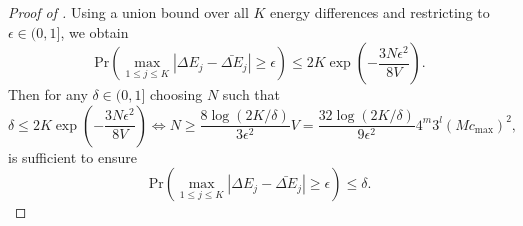 \begin{proof}[Proof of ]
    Using a union bound over all $K$ energy differences and restricting to $\epsilon\in (0,1]$, we obtain
    \begin{equation}
        \mathrm{Pr}\left(\max_{1\leq j\leq K}\left|\Delta E_j-\bar{\Delta E}_j \right|\geq \epsilon\right)\leq 2K\exp\left(-\frac{3N\epsilon^2}{8V} \right).
    \end{equation}
    Then for any $\delta \in (0,1]$ choosing $N$ such that 
    \begin{equation}
        \delta\leq2K\exp\left(-\frac{3N\epsilon^2}{8V} \right)\Leftrightarrow N\geq \frac{8\log(2K/\delta)}{3\epsilon^2}V=\frac{32\log(2K/\delta)}{9\epsilon^2}4^m3^l(Mc_\mathrm{max})^2,
    \end{equation}
    is sufficient to ensure
    \begin{equation}
        \mathrm{Pr}\left(\max_{1\leq j\leq K}\left|\Delta E_j-\bar{\Delta E}_j \right|\geq \epsilon\right)\leq\delta.
    \end{equation}
\end{proof}

